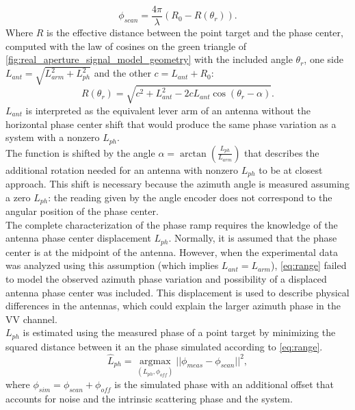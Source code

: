 \begin{equation}\label{eq:range_phase}
	\phi_{scan} = \frac{4 \pi}{\lambda}\left(R_0- R\left(\theta_r\right) \right).
\end{equation}
Where $R$ is the effective distance between the point target and the phase center, 
computed with the law of cosines on the green triangle of \autoref{fig:real_aperture_signal_model_geometry} with the included angle $\theta_r$, one  side $L_{ant} = \sqrt{L_{arm}^2 + L_{ph}^2}$ and the other $c = L_{ant} + R_0$:
\begin{equation}\label{eq:range}
	R\left(\theta_r\right) = \sqrt{ c^2 +  L_{ant}^2 - 2 c L_{ant} \cos{\left(\theta_r - \alpha\right)}}.
\end{equation}
$L_{ant}$ is interpreted as the equivalent lever arm of an antenna without the horizontal phase center shift that would produce the same phase variation as a system with a nonzero $L_{ph}$.\\
The function is shifted by the angle  $\alpha = \operatorname{\arctan}\left({\frac{L_{ph}}{L_{arm}}}\right)$ that describes the additional rotation needed for an antenna with nonzero $L_{ph}$ to be at closest approach. This shift is necessary because the azimuth angle is measured assuming a zero $L_{ph}$: the reading given by the angle encoder does not correspond to the angular position of the phase center.\\
The complete characterization of the phase ramp requires the knowledge of the antenna phase center displacement $L_{ph}$. Normally, it is assumed that the phase center is at the midpoint of the antenna. However, when the experimental data was analyzed using this assumption (which implies $L_{ant} = L_{arm}$),  \eqref{eq:range} failed to model the observed azimuth phase variation and possibility of a displaced antenna phase center was included. This displacement is used to describe physical differences in the antennas, which could explain the larger azimuth phase in the VV channel.\\ $L_{ph}$ is estimated using the measured phase of a point target by minimizing the squared distance between it an the phase simulated according to \eqref{eq:range}.
\begin{equation}\label{eq:rph_estimation}
	\hat{L}_{ph} = \underset{\left(L_{ph}, \phi_{off}\right)}{\operatorname{argmax}}{\vert\vert\phi_{meas} - \phi_{scan}\vert\vert}^2,
\end{equation}
where $\phi_{sim} = \phi_{scan} + \phi_{off}$ is the simulated phase with an additional offset that accounts for noise and the intrinsic scattering phase and the system.\\
